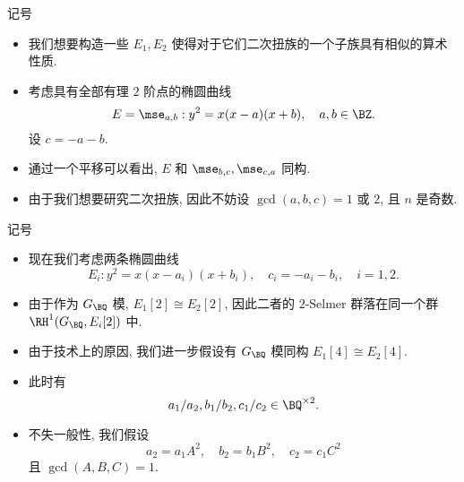 \documentclass[12pt,handout]{ctexbeamer}
\begin{document}
\begin{frame}{记号}
\begin{itemize}
\item 我们想要构造一些 $E_1,E_2$ 使得对于它们二次扭族的一个子族具有相似的算术性质.
\item 考虑具有全部有理 $2$ 阶点的椭圆曲线
\[E=\mse_{a,b}:y^2=x(x-a)(x+b),\quad a,b\in\BZ.\]
设 $c=-a-b$.
\item 通过一个平移可以看出, $E$ 和 $\mse_{b,c},\mse_{c,a}$ 同构.
\item 由于我们想要研究二次扭族, 因此不妨设 $\gcd(a,b,c)=1$ 或 $2$, 且 $n$ 是奇数.
\end{itemize}
\end{frame}

\begin{frame}[<+->]{记号}
\begin{itemize}
\item 现在我们考虑两条椭圆曲线
\[E_i:y^2=x(x-a_i)(x+b_i),\quad c_i=-a_i-b_i,\quad i=1,2.\]
\item 由于作为 $G_\BQ$ 模, $E_1[2]\cong E_2[2]$, 因此二者的 $2$-Selmer 群落在同一个群 $\RH^1(G_\BQ,E_i[2])$ 中. 
\item 由于技术上的原因, 我们进一步假设有 $G_\BQ$ 模同构 $E_1[4]\cong E_2[4]$.
\item 此时有
\[a_1/a_2,b_1/b_2,c_1/c_2\in\BQ^{\times2}.\]
\item 不失一般性, 我们假设
\[a_2=a_1 A^2,\quad b_2=b_1 B^2,\quad c_2=c_1 C^2 \]
且 $\gcd(A,B,C)=1$.
\end{itemize}
\end{frame}
\end{document}
